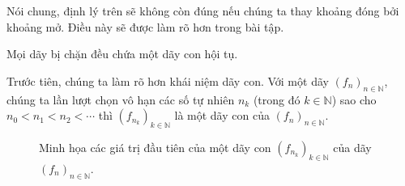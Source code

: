 Nói chung, định lý trên sẽ không còn đúng nếu chúng ta thay khoảng đóng bởi khoảng mở. Điều này sẽ được làm rõ hơn trong bài tập.

\begin{theorem}
    Mọi dãy bị chặn đều chứa một dãy con hội tụ.
\end{theorem}

Trước tiên, chúng ta làm rõ hơn khái niệm dãy con. Với một dãy ${(f_{n})}_{n\in\mathbb{N}}$, chúng ta lần lượt chọn vô hạn các số tự nhiên $n_{k}$ (trong đó $k\in\mathbb{N}$) sao cho $n_{0} < n_{1} < n_{2} < \cdots$ thì ${(f_{n_{k}})}_{k\in\mathbb{N}}$ là một dãy con của ${(f_{n})}_{n\in\mathbb{N}}$.
\begin{figure}[htp]
    \centering
    \caption{Minh họa các giá trị đầu tiên của một dãy con ${(f_{n_{k}})}_{k\in\mathbb{N}}$ của dãy ${(f_{n})}_{n\in\mathbb{N}}$.}
\end{figure}

